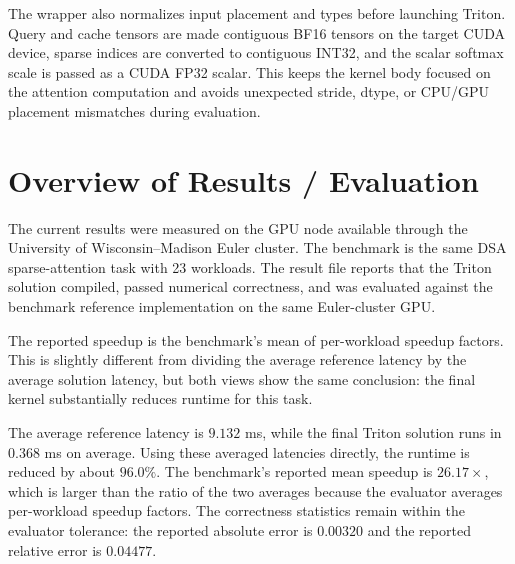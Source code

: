 \documentclass{article}
\begin{document}
The wrapper also normalizes input placement and types before launching Triton. Query and
cache tensors are made contiguous BF16 tensors on the target CUDA device, sparse indices
are converted to contiguous INT32, and the scalar softmax scale is passed as a CUDA FP32
scalar. This keeps the kernel body focused on the attention computation and avoids
unexpected stride, dtype, or CPU/GPU placement mismatches during evaluation.

\section{Overview of Results / Evaluation}

The current results were measured on the GPU node available through the University of
Wisconsin--Madison Euler cluster. The benchmark is the same DSA sparse-attention task
with 23 workloads. The result file reports that the Triton solution compiled, passed
numerical correctness, and was evaluated against the benchmark reference implementation
on the same Euler-cluster GPU.

The reported speedup is the benchmark's mean of per-workload speedup factors. This is
slightly different from dividing the average reference latency by the average solution
latency, but both views show the same conclusion: the final kernel substantially
reduces runtime for this task.

\begin{table}[h]
\centering
\caption{DSA sparse-attention benchmark results on the Euler cluster GPU.}
\label{tab:results}
\end{table}

The average reference latency is $9.132$ ms, while the final Triton solution runs in
$0.368$ ms on average. Using these averaged latencies directly, the runtime is reduced
by about $96.0\%$. The benchmark's reported mean speedup is $26.17\times$, which is
larger than the ratio of the two averages because the evaluator averages per-workload
speedup factors. The correctness statistics remain within the evaluator tolerance: the
reported absolute error is $0.00320$ and the reported relative error is $0.04477$.
\end{document}
